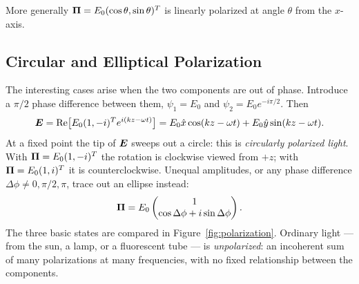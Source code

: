 \begin{example}
More generally $\vect{\Pi} = E_0(\cos\theta, \sin\theta)^T$ is linearly polarized at angle $\theta$ from the $x$-axis.
\end{example}

\subsection{Circular and Elliptical Polarization}

The interesting cases arise when the two components are out of phase. Introduce a $\pi/2$ phase difference between them, $\psi_1 = E_0$ and $\psi_2 = E_0 e^{-i\pi/2}$. Then
\begin{equation}
    \vect{E} = \operatorname{Re}\bigl[E_0(1, -i)^T e^{i(kz-\omega t)}\bigr] = E_0\hat{x}\cos(kz-\omega t) + E_0\hat{y}\sin(kz-\omega t).
\end{equation}
At a fixed point the tip of $\vect{E}$ sweeps out a circle: this is \emph{circularly polarized light}. With $\vect{\Pi} = E_0(1, -i)^T$ the rotation is clockwise viewed from $+z$; with $\vect{\Pi} = E_0(1, i)^T$ it is counterclockwise. Unequal amplitudes, or any phase difference $\Delta\phi \neq 0, \pi/2, \pi$, trace out an ellipse instead:
\begin{equation}
    \vect{\Pi} = E_0\begin{pmatrix} 1 \\ \cos\Delta\phi + i\sin\Delta\phi\end{pmatrix}.
\end{equation}
The three basic states are compared in Figure~\ref{fig:polarization}. Ordinary light --- from the sun, a lamp, or a fluorescent tube --- is \emph{unpolarized}: an incoherent sum of many polarizations at many frequencies, with no fixed relationship between the components.

